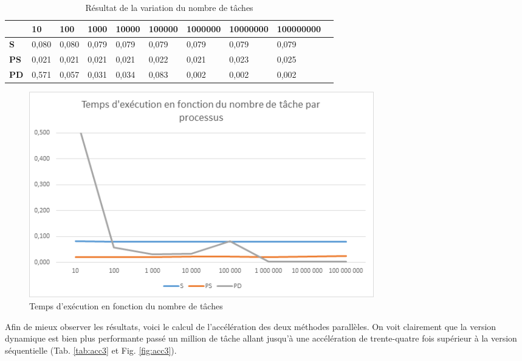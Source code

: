 \documentclass[a4paper,12pt]{article}
\begin{document}
\begin{table}[H]
\caption{Résultat de la variation du nombre de tâches}
\label{tab:tempsexec3}
\begin{tabular}{|l|l|l|l|l|l|l|l|l|l|}
\hline
            & \textbf{10} & \textbf{100} & \textbf{1000} & \textbf{10000} & \textbf{100000} & \textbf{1000000} & \textbf{10000000} & \textbf{100000000} \\ \hline
\textbf{S}  & 0,080        & 0,080        & 0,079       	 & 0,079         & 0,079          & 0,079           & 0,079            & 0,079             \\ \hline
\textbf{PS} & 0,021       & 0,021        & 0,021         & 0,021          & 0,022           & 0,021            & 0,023             & 0,025              \\ \hline
\textbf{PD} & 0,571       & 0,057        & 0,031         & 0,034          & 0,083           & 0,002            & 0,002             & 0,002              \\ \hline

\end{tabular}
\end{table}

\begin{figure}[H]
\center \includegraphics[width=15cm]{exec3}
\caption{Temps d'exécution en fonction du nombre de tâches}
\label{fig:tempsexec3}
\end{figure}

Afin de mieux observer les résultats, voici le calcul de l'accélération des deux méthodes parallèles. On voit clairement que la version dynamique est bien plus performante passé un million de tâche allant jusqu'à une accélération de trente-quatre fois supérieur à la version séquentielle (Tab. \ref{tab:acc3} et Fig. \ref{fig:acc3}). 
\end{document}
